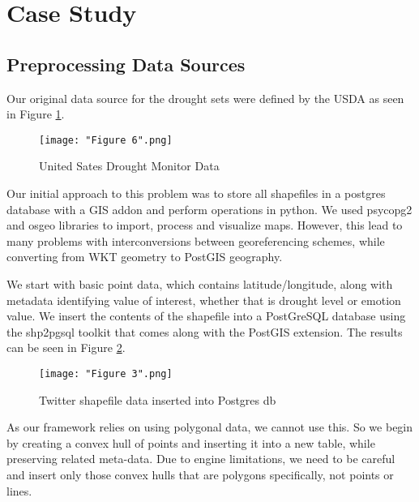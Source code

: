 \documentclass[conference]{IEEEtran}
\begin{document}
\section{Case Study}

\subsection{Preprocessing Data Sources}

Our original data source for the drought sets were defined by the USDA as seen in Figure \ref{Figure 2}.

\begin{figure}[ht]
\centerline{\texttt{[image: "Figure 6".png]}}
\caption{United Sates Drought Monitor Data}
\label{Figure 2}
\end{figure}

Our initial approach to this problem was to store all shapefiles in a postgres database with a GIS addon and perform operations in python. We used psycopg2 and osgeo libraries to import, process and visualize maps. However, this lead to many problems with interconversions between georeferencing schemes, while converting from WKT geometry to PostGIS geography.

We start with basic point data, which contains latitude/longitude, along with metadata identifying value of interest, whether that is drought level or emotion value. We insert the contents of the shapefile into a PostGreSQL database using the shp2pgsql toolkit that comes along with the PostGIS extension. The results can be seen in Figure \ref{Figure 3}.

\begin{figure}[ht]
\centerline{\texttt{[image: "Figure 3".png]}}
\caption{Twitter shapefile data inserted into Postgres db}
\label{Figure 3}
\end{figure}

As our framework relies on using polygonal data, we cannot use this. So we begin by creating a convex hull of points and inserting it into a new table, while preserving related meta-data. Due to engine limitations, we need to be careful and insert only those convex hulls that are polygons specifically, not points or lines.
\end{document}
